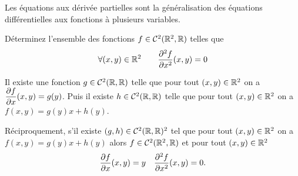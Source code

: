 Les équations aux dérivée partielles sont la généralisation des équations différentielles aux fonctions à plusieurs variables.



Déterminez l'ensemble des fonctions \(f \in \mathcal{C}^{2}(\mathbb{R}^2, \mathbb{R})\) telles que
\begin{equation}
  \forall (x,y) \in \mathbb{R}^2 \qquad \dfrac{\partial{}^2 f}{\partial{} {x}^2}(x, y) = 0
\end{equation}


Il existe une fonction \(g \in \mathcal{C}^{2}(\mathbb{R}, \mathbb{R})\) telle que pour tout \((x, y) \in \mathbb{R}^2\) on a \(\dfrac{\partial{} f}{\partial{} x}(x, y)=g(y)\). Puis il existe \(h \in  \mathcal{C}^{2}(\mathbb{R}, \mathbb{R})\) telle que pour tout \((x, y) \in \mathbb{R}^2\) on a \(f(x, y) = g(y)x+h(y)\).

Réciproquement, s'il existe \((g, h) \in \mathcal{C}^{2}(\mathbb{R}, \mathbb{R})^2\) tel que pour tout \((x, y) \in \mathbb{R}^2\) on a \(f(x, y) = g(y)x+h(y)\) alors \(f \in \mathcal{C}^{2}(\mathbb{R}^2, \mathbb{R})\) et pour tout \((x, y) \in \mathbb{R}^2\)
\begin{equation}
  \dfrac{\partial{} f}{\partial{} x}(x,y)=y \quad   \dfrac{\partial{}^2 f}{\partial{} {x}^2}(x,y)=0.
\end{equation}
